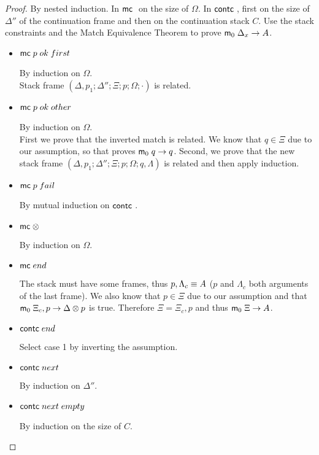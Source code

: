 \begin{proof}
   By nested induction. In $\mathsf{mc} \;$ on the size of $\Omega$. In $\mathsf{contc} \;$, first on the size of $\Delta''$ of the continuation frame and then on the continuation stack $C$. Use the stack constraints and the Match Equivalence Theorem to prove $\mathsf{m}_0 \; \Delta_x \rightarrow A$.
   
   \begin{itemize}
      \item $\mathsf{mc} \; p \; ok \; first$
      
      By induction on $\Omega$.\\
      Stack frame $(\Delta, p_1; \Delta''; \Xi; p; \Omega; \cdot)$ is related. \\
      
      \item $\mathsf{mc} \; p \; ok \; other$
      
      By induction on $\Omega$.\\
      First we prove that the inverted match is related. We know that
      $q \in \Xi$ due to our assumption, so that proves $\mathsf{m}_0 \; q \rightarrow q$. Second, we prove that the new stack frame $(\Delta, p_1; \Delta''; \Xi; p; \Omega; q, \Lambda)$ is related and then apply induction.
      
      \item $\mathsf{mc} \; p \; fail$
      
      By mutual induction on $\mathsf{contc} \;$.
      
      \item $\mathsf{mc} \; \otimes$
      
      By induction on $\Omega$. \\
      
      \item $\mathsf{mc} \; end$
      
      The stack must have some frames, thus $p, \Lambda_c \equiv A$ ($p$ and $\Lambda_c$ both arguments of the last frame). We also know that $p \in \Xi$ due to our assumption and that $\mathsf{m}_0 \; \Xi_c, p \rightarrow \Delta \otimes p$ is true. Therefore $\Xi = \Xi_c, p$ and thus $\mathsf{m}_0 \; \Xi \rightarrow A$.
      
      \item $\mathsf{contc} \; end$
      
      Select case 1 by inverting the assumption.
      
      \item $\mathsf{contc} \; next$
      
      By induction on $\Delta''$.\\
      
      \item $\mathsf{contc} \; next \; empty$
      
      By induction on the size of $C$.
      
   \end{itemize}
\end{proof}

